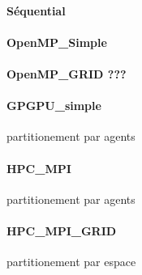 \documentclass[liens,entete-ensimag,margeCorrection]{ensirapport}
\begin{document}
\paragraph{Séquential}

\paragraph{OpenMP\_Simple}
\paragraph{OpenMP\_GRID ???}

\paragraph{GPGPU\_simple} partitionement par agents

\paragraph{HPC\_MPI} partitionement par agents
\paragraph{HPC\_MPI\_GRID} partitionement par espace
\end{document}
